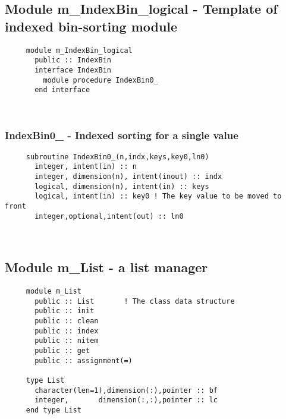   \subsection{Module m\_IndexBin\_logical - Template of indexed bin-sorting module }

\begin{verbatim} 
     module m_IndexBin_logical
       public :: IndexBin
       interface IndexBin
         module procedure IndexBin0_
       end interface
 \end{verbatim} %
 
 
\mbox{}\hrulefill\ 
 

  \subsubsection{IndexBin0\_ - Indexed sorting for a single value}

\begin{verbatim} 
     subroutine IndexBin0_(n,indx,keys,key0,ln0)
       integer, intent(in) :: n
       integer, dimension(n), intent(inout) :: indx
       logical, dimension(n), intent(in) :: keys
       logical, intent(in) :: key0 ! The key value to be moved to front
       integer,optional,intent(out) :: ln0
 \end{verbatim} %


 
 
\mbox{}\hrulefill\ 
 
  \subsection{Module m\_List - a list manager }

\begin{verbatim} 
     module m_List 
       public :: List		! The class data structure
       public :: init
       public :: clean
       public :: index
       public :: nitem
       public :: get
       public :: assignment(=)
 
     type List
       character(len=1),dimension(:),pointer :: bf
       integer,       dimension(:,:),pointer :: lc
     end type List
 \end{verbatim} %
 
